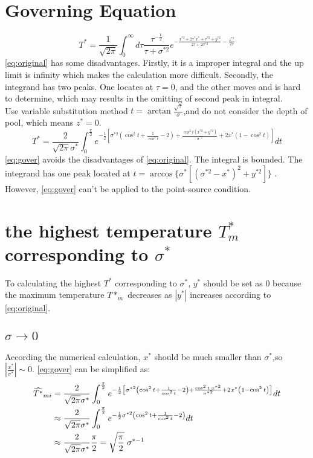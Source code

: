 \documentclass[review, 1p, number, sort&compress,table]{elsarticle}
\begin{document}
	\section{Governing Equation}\label{sec:governing}
		\begin{equation}  \label{eq:original}
		T^*=\frac{1}{\sqrt{2\pi}}\int_{0}^{\infty}{d\tau}\frac{\tau^{-\frac{1}{2}}}{\tau+\sigma^{*2}}e^{-\frac{x^{*2}+2\tau^*x^{*}+\tau^{*2}+y^{*2}}{2\tau+2\sigma^{*2}}-\frac{z^{*2}}{2\tau}}
		\end{equation}
		\autoref{eq:original} has some disadvantages. Firstly, it is a improper integral and the up limit is infinity which makes the calculation more difficult. Secondly, the integrand has two peaks. One locates at $\tau=0$, and the other moves and is hard to determine, which may results in the omitting of second peak in integral.  \\
		Use variable substitution method $t=\arctan{\frac{\sqrt{\tau}}{\sigma}}$,and do not consider the depth of  pool, which means $z^*=0$.
		\begin{equation} \label{eq:gover}
		T^{*}=\frac{2}{\sqrt{2\pi}\sigma^*}\int_{0}^{\frac{\pi}{2}} e^{-\frac{1}{2}\left[\sigma^{*2}\left(\cos^2{t}+\frac{1}{\cos^2{t}}-2 \right)+\frac{\cos^2{t}\left(x^{*2}+y^{*2}\right) }{\sigma^{*2}}+2x^{*}\left( 1-\cos^2{t} \right)          \right] }dt
		\end{equation}
		\autoref{eq:gover} avoids the disadvantages of \autoref{eq:original}. The integral  is bounded. The integrand has one peak located  at $t=\arccos{\{\sigma^{*}[(\sigma^{*2}-x^{*})^2+y^{*2}]}\}$ . However, \autoref{eq:gover} can't be applied to the point-source condition.   \\ 
		
	\section{the highest temperature $T^{*}_m$ corresponding to $\sigma^{*}$}\label{sec:2}	
	To calculating the highest $T^{*}$ corresponding to $\sigma^{*}$, $y^{*}$ should be set as $0$ because the maximum temperature $T*_m$ decreases as $|y^*|$ increases according to \autoref{eq:original}.
	\subsection{$\sigma\rightarrow{0}$}
	According the numerical calculation, $x^{*}$ should be much smaller than $\sigma^{*}$,so $|\frac{x^{*}}{\sigma^{*}}|\sim 0$. \autoref{eq:gover} can be simplified as:	
		\begin{align} \label{eq:TvS.0}
				\nonumber 
				\widehat{T^{*}}_{m\uppercase\expandafter{\romannumeral1}} &=\frac{2}{\sqrt{2\pi}\sigma^*}\int_{0}^{\frac{\pi}{2}} e^{-\frac{1}{2}\left[\sigma^{*2}\left(\cos^2{t}+\frac{1}{\cos^2{t}}-2 \right)+\frac{\cos^2{t} \; x^{*2}}{\sigma^{*2}}+2x^{*}\left( 1-\cos^2{t} \right)\right] }dt
				\\  \nonumber 
				&\approx\frac{2}{\sqrt{2\pi}\sigma^*}\int_{0}^{\frac{\pi}{2}} e^{-\frac{1}{2}\sigma^{*2}\left(\cos^2{t}+\frac{1}{\cos^2{t}}-2 \right) }dt
				\\ 
				&\approx \frac{2}{\sqrt{2\pi}\sigma^*}\frac{\pi}{2} = \sqrt{\frac{\pi}{2}}    \; \sigma^{*-1} 
		\end{align}
\end{document}
